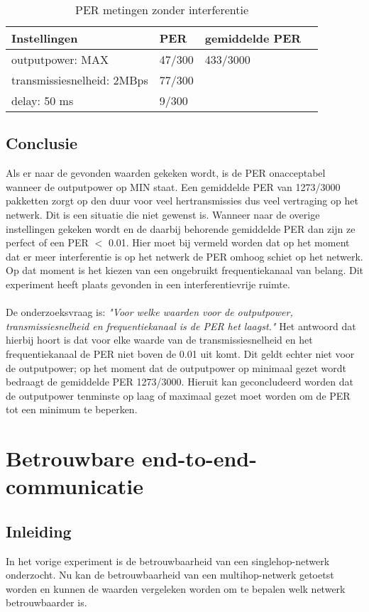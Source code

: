 \documentclass{article}
\begin{document}
\begin{table}[h]
\centering \caption{PER metingen zonder interferentie}
\label{table:interferentie}
\begin{tabular}{ | l | l | l | p{5cm} |}
    \hline
    Instellingen				& PER 		& gemiddelde PER\\ \hline
    outputpower: MAX 			& 47/300 	& 433/3000		\\ 
    transmissiesnelheid: 2MBps 	& 77/300 	&  				\\ 
    delay: 50 ms 				& 9/300 	&  				\\ \hline
\end{tabular}
\end{table}

\subsection{Conclusie}
Als er naar de gevonden waarden gekeken wordt, is de PER onacceptabel wanneer de outputpower op MIN staat. Een gemiddelde PER van 1273/3000 pakketten zorgt op den duur voor veel hertransmissies dus veel vertraging op het netwerk. Dit is een situatie die niet gewenst is. Wanneer naar de overige instellingen gekeken wordt en de daarbij behorende gemiddelde PER dan zijn ze perfect of een PER $<$ 0.01. Hier moet bij vermeld worden dat op het moment dat er meer interferentie is op het netwerk de PER omhoog schiet op het netwerk. Op dat moment is het kiezen van een ongebruikt frequentiekanaal van belang. Dit experiment heeft plaats gevonden in een interferentievrije ruimte.\\
\\
De onderzoeksvraag is: \textit{"Voor welke waarden voor de outputpower, transmissiesnelheid en frequentiekanaal is de PER het laagst."} Het antwoord dat hierbij hoort is dat voor elke waarde van de transmissiesnelheid en het frequentiekanaal de PER niet boven de 0.01 uit komt. Dit geldt echter niet voor de outputpower; op het moment dat de outputpower op minimaal gezet wordt bedraagt de gemiddelde PER 1273/3000. Hieruit kan geconcludeerd worden dat de outputpower tenminste op laag of maximaal gezet moet worden om de PER tot een minimum te beperken. 

\newpage

\clearpage
\section{Betrouwbare end-to-end-communicatie}

\subsection{Inleiding}
In het vorige experiment is de betrouwbaarheid van een singlehop-netwerk onderzocht. Nu kan de betrouwbaarheid van een multihop-netwerk getoetst worden en kunnen de waarden vergeleken worden om te bepalen welk netwerk betrouwbaarder is. 
\end{document}
